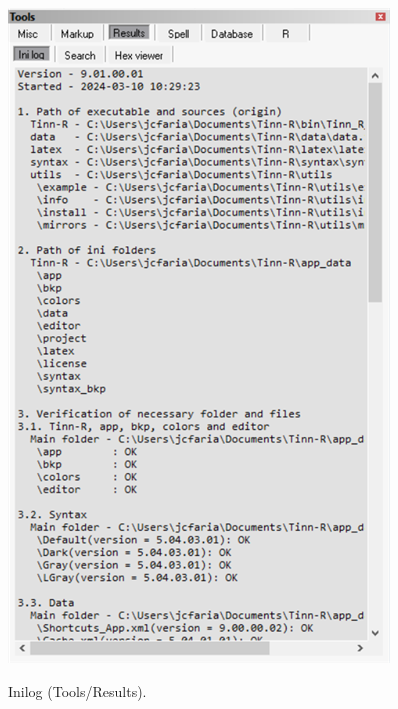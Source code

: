 \begin{figure}[H]
  \includegraphics[scale=0.6]{./res/tools_results_inilog.png}\\
  \caption{Inilog (Tools/Results).}
  \label{fig:tools_results_inilog}
\end{figure}

